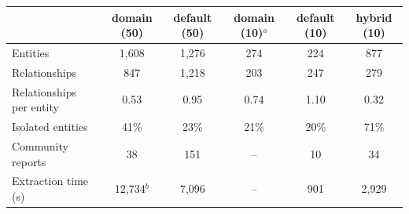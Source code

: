 \begin{tabular}{lccccc}
\toprule
 & domain (50) & default (50) & domain (10)$^a$ & default (10) & hybrid (10) \\
\midrule
Entities & 1,608 & 1,276 & 274 & 224 & 877 \\
Relationships & 847 & 1,218 & 203 & 247 & 279 \\
Relationships per entity & 0.53 & 0.95 & 0.74 & 1.10 & 0.32 \\
Isolated entities & 41\% & 23\% & 21\% & 20\% & 71\% \\
Community reports & 38 & 151 & -- & 10 & 34 \\
Extraction time (s) & 12,734$^b$ & 7,096 & -- & 901 & 2,929 \\
\bottomrule
\end{tabular}
